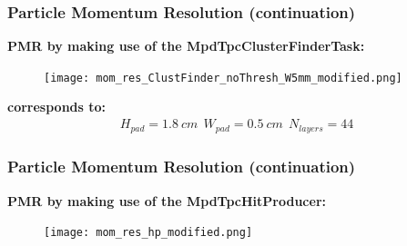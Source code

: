 \documentclass[svgnames] {beamer}
\begin{document}
\begin{frame}

  \frametitle{Particle Momentum Resolution (continuation)}
  
  \begin{block}{}
    \textbf {PMR by making use of the MpdTpcClusterFinderTask:}
  \end{block}
  
  \begin{block}{}
    \begin{figure}[!h]
      \centering
      \texttt{[image: mom\_res\_ClustFinder\_noThresh\_W5mm\_modified.png]}
    \end{figure}
  \end{block}
    
  \begin{block}{}
    \textbf {{\color{green}{Green Line}} corresponds to:}
    \begin{eqnarray*}
      H_{pad} = 1.8~cm ~~ 
      W_{pad} = 0.5~cm ~~
      N_{layers} = 44
    \end{eqnarray*}
  \end{block}
\end{frame}
  

\begin{frame}

  \frametitle{Particle Momentum Resolution (continuation)}

\begin{block}{}
  \textbf {PMR by making use of the MpdTpcHitProducer:}
\end{block}

\begin{figure}[!h]
  \centering
  \texttt{[image: mom\_res\_hp\_modified.png]}
\end{figure}

\end{frame}

\end{document}
